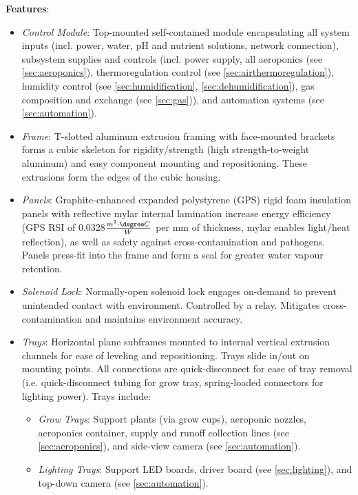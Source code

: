 \textbf{Features}:
\begin{itemize}
    \item \textit{Control Module}: Top-mounted self-contained module encapsulating all system inputs (incl. power, water, pH and nutrient solutions, network connection), subsystem supplies and controls (incl. power supply, all aeroponics (see \ref{sec:aeroponics}), thermoregulation control (see \ref{sec:airthermoregulation}), humidity control (see \ref{sec:humidification}, \ref{sec:dehumidification}), gas composition and exchange (see \ref{sec:gas})), and automation systems (see \ref{sec:automation}).
    \item \textit{Frame}: T-slotted aluminum extrusion framing with face-mounted brackets forms a cubic skeleton for rigidity/strength (high strength-to-weight aluminum) and easy component mounting and repositioning. These extrusions form the edges of the cubic housing. %
    \item \textit{Panels}: Graphite-enhanced expanded polystyrene (GPS) rigid foam insulation panels \cite{insulation} with reflective mylar internal lamination increase energy efficiency (GPS RSI of 0.0328$\frac{m^2 \cdot \degree C}{W}$ per mm of thickness, mylar enables light/heat reflection), as well as safety against cross-contamination and pathogens. Panels press-fit into the frame and form a seal for greater water vapour retention. %
    \item \textit{Solenoid Lock}: Normally-open solenoid lock engages on-demand to prevent unintended contact with environment. Controlled by a relay. Mitigates cross-contamination and maintains environment accuracy.
    \item \textit{Trays}: Horizontal plane subframes mounted to internal vertical extrusion channels for ease of leveling and repositioning. Trays slide in/out on mounting points. All connections are quick-disconnect for ease of tray removal (i.e. quick-disconnect tubing for grow tray, spring-loaded connectors for lighting power). Trays include:
    \begin{itemize}
        \item \textit{Grow Trays}: Support plants (via grow cups), aeroponic nozzles, aeroponics container, supply and runoff collection lines (see \ref{sec:aeroponics}), and side-view camera (see \ref{sec:automation}).
        \item \textit{Lighting Trays}: Support LED boards, driver board (see \ref{sec:lighting}), and top-down camera (see \ref{sec:automation}).
    \end{itemize}
\end{itemize}

